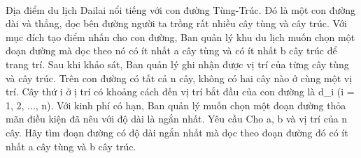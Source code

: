  

Địa điểm du lịch Dailai nổi tiếng với con đường Tùng-Trúc. Đó là một con đường dài và thẳng, dọc bên đường người ta trồng rất nhiều cây tùng và cây trúc. Với mục đích tạo điểm nhấn cho con đường, Ban quản lý khu du lịch muốn chọn một đoạn đường mà dọc theo nó có ít nhất a cây tùng và có ít nhất b cây trúc để trang trí. Sau khi khảo sát, Ban quản lý ghi nhận được vị trí của từng cây tùng và cây trúc. Trên con đường có tất cả n cây, không có hai cây nào ở cùng một vị trí. Cây thứ i ở ị trí có khoảng cách đến vị trí bắt đầu của con đường là d\_i (i = 1, 2, ..., n). Với kinh phí có hạn, Ban quản lý muốn chọn một đoạn đường thỏa mãn điều kiện đã nêu với độ dài là ngắn nhất.
Yêu cầu
Cho a, b và vị trí của n cây. Hãy tìm đoạn đường có độ dài ngắn nhất mà dọc theo đoạn đường đó có ít nhất a cây tùng và b cây trúc.